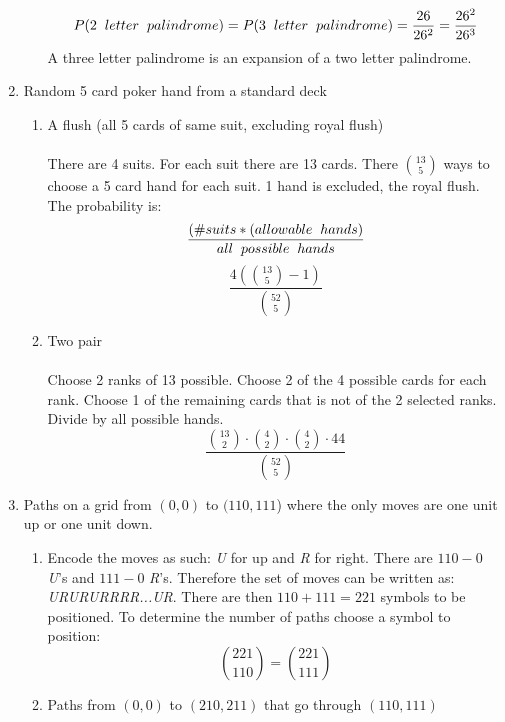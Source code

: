 \documentclass[11pt, oneside]{article}   	%
\begin{document}
\begin{enumerate}
\begin{enumerate}
			\[ P(2 \hspace{2mm} letter \hspace{2mm} palindrome) = P(3 \hspace{2mm} letter \hspace{2mm} palindrome) = \frac{26}{26^2} = \frac{26^2}{26^3} \]
			A three letter palindrome is an expansion of a two letter palindrome.
			\end{enumerate}
		\item Random 5 card poker hand from a standard deck
			\begin{enumerate}
				\item A flush (all 5 cards of same suit, excluding royal flush) \\\\
					There are 4 suits. For each suit there are 13 cards. There $\binom{13}{5}$ ways to choose a 5 card hand for each suit. 1 hand is excluded, the royal flush.\\
					The probability is: \[ \frac{(\# suits * ( allowable \hspace{2mm} hands )}{all \hspace{2mm} possible \hspace{2mm} hands} \]
					\[ \frac{4 (\binom{13}{5} - 1)}{\binom{52}{5}} \]
				\item Two pair \\\\
					Choose 2 ranks of 13 possible. Choose 2 of the 4 possible cards for each rank. Choose 1 of the remaining cards that is not of the 2 selected ranks. Divide by all possible hands.
					\[ \frac{\binom{13}{2} \cdot \binom{4}{2} \cdot \binom{4}{2} \cdot 44}{\binom{52}{5}} \]
			\end{enumerate}
		\item Paths on a grid from $(0, 0)$ to $(110, 111$) where the only moves are one unit up or one unit down.
			\begin{enumerate}
				\item Encode the moves as such: \textit{U} for up and \textit{R} for right. There are $110 - 0$ \textit{U}'s and $111 - 0$ \textit{R}'s. Therefore the set of moves can be written as: \textit{URURURRRR...UR}. There are then $110 + 111 = 221$ symbols to be
				positioned. To determine the number of paths choose a symbol to position: \[ \binom{221}{110} = \binom{221}{111} \]
				\item Paths from $(0, 0)$ to $(210, 211)$ that go through $(110, 111)$ \\\\

\end{enumerate}
\end{enumerate}
\end{document}
